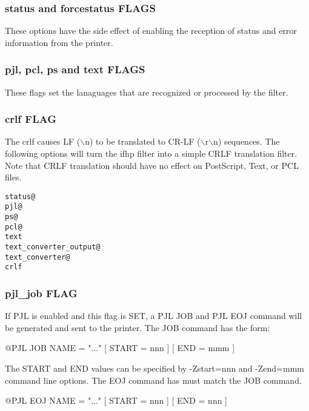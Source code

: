 \documentclass[a4paper]{article}
\begin{document}
\subsubsection{status and forcestatus FLAGS}

These options have the side effect of enabling the reception of status
and error information from the printer.


\subsubsection{pjl, pcl, ps and text FLAGS}

These flags set the lanaguages that are recognized or processed by
the filter.


\subsubsection{crlf FLAG
\label{crlf}}

The
{\ttfamily crlf}
causes LF ({\ttfamily $\backslash$n}) to be translated to CR-LF
({\ttfamily $\backslash$r$\backslash$n}) sequences.
The following options will turn the
{\ttfamily ifhp}
filter into a simple CRLF translation filter.
Note that CRLF translation should have no effect
on PostScript, Text, or PCL files.
\begin{tscreen}
\begin{verbatim}
status@
pjl@
ps@
pcl@
text
text_converter_output@
text_converter@
crlf
\end{verbatim}
\end{tscreen}



\subsubsection{pjl\_job FLAG
\label{pjl_job}}

If PJL is enabled and this flag is SET,
a PJL JOB and PJL EOJ command will be generated
and sent to the printer.
The JOB command has the form:
\begin{tscreen}
@PJL JOB NAME = "..." {[} START = nnn {]} {[} END = mmm {]}
\end{tscreen}

The START and END values can be specified by
{\ttfamily -Zstart=nnn}
and
{\ttfamily -Zend=mmm}
command line options.
The EOJ command has must match the JOB command.
\begin{tscreen}
@PJL EOJ NAME = "..." {[} START = nnn {]} {[} END = nnn {]}
\end{tscreen}
\end{document}

